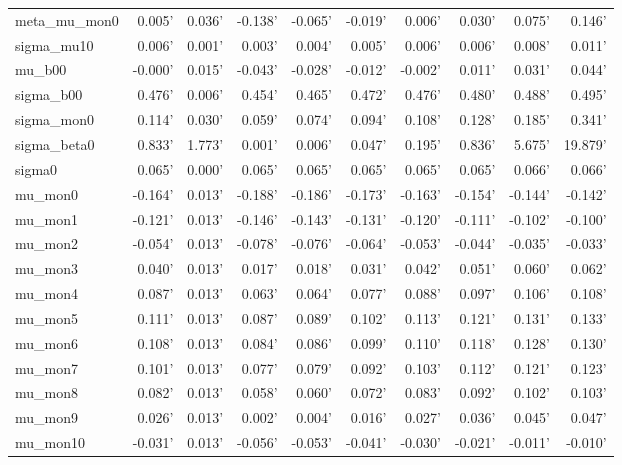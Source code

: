 \begin{tabular}{lrrrrrrrrr}
meta\_mu\_mon0 &  0.005' & 0.036' & -0.138' & -0.065' & -0.019' &  0.006' &  0.030' &  0.075' &  0.146' \\
sigma\_mu10   &  0.006' & 0.001' &  0.003' &  0.004' &  0.005' &  0.006' &  0.006' &  0.008' &  0.011' \\
mu\_b00       & -0.000' & 0.015' & -0.043' & -0.028' & -0.012' & -0.002' &  0.011' &  0.031' &  0.044' \\
sigma\_b00    &  0.476' & 0.006' &  0.454' &  0.465' &  0.472' &  0.476' &  0.480' &  0.488' &  0.495' \\
sigma\_mon0   &  0.114' & 0.030' &  0.059' &  0.074' &  0.094' &  0.108' &  0.128' &  0.185' &  0.341' \\
sigma\_beta0  &  0.833' & 1.773' &  0.001' &  0.006' &  0.047' &  0.195' &  0.836' &  5.675' & 19.879' \\
sigma0       &  0.065' & 0.000' &  0.065' &  0.065' &  0.065' &  0.065' &  0.065' &  0.066' &  0.066' \\
mu\_mon0      & -0.164' & 0.013' & -0.188' & -0.186' & -0.173' & -0.163' & -0.154' & -0.144' & -0.142' \\
mu\_mon1      & -0.121' & 0.013' & -0.146' & -0.143' & -0.131' & -0.120' & -0.111' & -0.102' & -0.100' \\
mu\_mon2      & -0.054' & 0.013' & -0.078' & -0.076' & -0.064' & -0.053' & -0.044' & -0.035' & -0.033' \\
mu\_mon3      &  0.040' & 0.013' &  0.017' &  0.018' &  0.031' &  0.042' &  0.051' &  0.060' &  0.062' \\
mu\_mon4      &  0.087' & 0.013' &  0.063' &  0.064' &  0.077' &  0.088' &  0.097' &  0.106' &  0.108' \\
mu\_mon5      &  0.111' & 0.013' &  0.087' &  0.089' &  0.102' &  0.113' &  0.121' &  0.131' &  0.133' \\
mu\_mon6      &  0.108' & 0.013' &  0.084' &  0.086' &  0.099' &  0.110' &  0.118' &  0.128' &  0.130' \\
mu\_mon7      &  0.101' & 0.013' &  0.077' &  0.079' &  0.092' &  0.103' &  0.112' &  0.121' &  0.123' \\
mu\_mon8      &  0.082' & 0.013' &  0.058' &  0.060' &  0.072' &  0.083' &  0.092' &  0.102' &  0.103' \\
mu\_mon9      &  0.026' & 0.013' &  0.002' &  0.004' &  0.016' &  0.027' &  0.036' &  0.045' &  0.047' \\
mu\_mon10     & -0.031' & 0.013' & -0.056' & -0.053' & -0.041' & -0.030' & -0.021' & -0.011' & -0.010' \\

\end{tabular}
